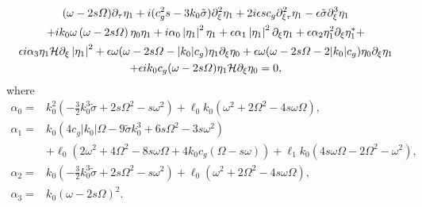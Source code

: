 \documentclass{JFM_Style/jfm}
\begin{document}
\begin{multline}
(\omega-2s\varOmega)\partial_{\tau}\eta_{1} + i(c_{g}^{2}s-3k_{0}\tilde{\sigma})\partial_{\xi}^{2}\eta_{1} + 2i\epsilon s c_{g}\partial^{2}_{\xi\tau}\eta_{1} - \epsilon\tilde{\sigma} \partial^{3}_{\xi}\eta_{1} \\
+ ik_{0}\omega\left(\omega-2s\varOmega\right)\eta_{0}\eta_{1} +
i \alpha_{0}\left|\eta_{1}\right|^{2}\eta_{1} 
+ \epsilon\alpha_{1}\left|\eta_{1}\right|^{2}\partial_{\xi}\eta_{1} 
+ \epsilon\alpha_{2}\eta_{1}^{2}\partial_{\xi}\eta^{\ast}_{1} + \\
\epsilon i\alpha_{3}\eta_{1}\mathcal{H}\partial_{\xi}\left|\eta_{1}\right|^{2}
 + \epsilon \omega(\omega-2s\varOmega-|k_{0}|c_{g})\eta_{1}\partial_{\xi}\eta_{0} + \epsilon\omega(\omega-2s\varOmega-2|k_{0}|c_{g})\eta_{0}\partial_{\xi}\eta_{1} \\
+ \epsilon ik_{0}c_{g}(\omega-2s\varOmega)\eta_{1}\mathcal{H}\partial_{\xi}\eta_{0} = 0, 
\label{mnls}
\end{multline}
where
\begin{align*}
\alpha_{0} = & k_{0}^{2}\left(-\frac{3}{2}k_{0}^{3}\tilde{\sigma} + 2s\Omega^{2}-s\omega^{2}\right) + \ell_{0}k_{0}\left(\omega^{2}+2\Omega^{2}-4s\omega\Omega\right),\\
\alpha_{1} = & k_{0}\left(4c_{g}|k_{0}|\Omega - 9\tilde{\sigma}k_{0}^{3}+6s\Omega^{2}-3s\omega^{2}\right) \\
& + \ell_{0} \left(2\omega^{2}+4\Omega^{2}-8s\omega\Omega+4k_{0}c_{g}(\Omega-s\omega)\right) + \ell_{1}k_{0}\left(4s\omega\Omega-2\Omega^{2}-\omega^{2}\right),\\
\alpha_{2} = & k_{0}\left(-\frac{3}{2}k_{0}^{3}\tilde{\sigma}+2s\Omega^{2}-s\omega^{2}\right)  + \ell_{0}\left(\omega^{2} + 2\Omega^{2}-4s\omega\Omega\right),\\
\alpha_{3} = & k_{0}\left(\omega-2s\Omega\right)^{2}.
\end{align*}
\end{document}
